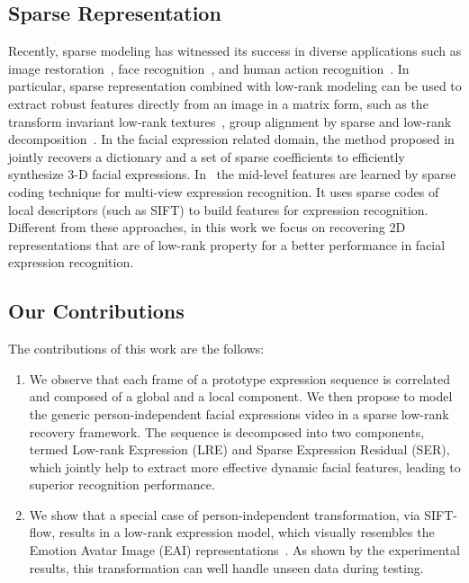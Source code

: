 \documentclass[journal]{IEEEtran}
\begin{document}
\subsection{Sparse Representation}

Recently, sparse modeling has witnessed its success in diverse applications such as image restoration~\cite{Yang_CVPR08}, face recognition~\cite{Wright_PAMI09}, and human action recognition~\cite{Qiu_ICCV11}. In particular, sparse representation combined with low-rank modeling can be used to extract robust features directly from an image in a matrix form, such as the transform invariant low-rank textures~\cite{Zhang_IJCV12}, group alignment by sparse and low-rank decomposition~\cite{Peng_PAMI12}. In the facial expression related domain, the method proposed in~\cite{Lin12} jointly recovers a dictionary and a set of sparse coefficients to efficiently synthesize 3-D facial expressions. In~\cite{Tariq12} the mid-level features are learned by sparse coding technique for multi-view expression recognition. It uses sparse codes of local descriptors (such as SIFT) to build features for expression recognition. Different from these approaches, in this work we focus on recovering 2D representations that are of low-rank property for a better performance in facial expression recognition. 

\subsection{Our Contributions}
The contributions of this work are the follows:
\begin{enumerate}
\item We observe that each frame of a prototype expression sequence is correlated and composed of a global and a local component. We then propose to model the generic person-independent facial expressions video in a sparse low-rank recovery framework. The sequence is decomposed into two components, termed Low-rank Expression (LRE) and Sparse Expression Residual (SER), which jointly help to extract more effective dynamic facial features, leading to superior recognition performance. 
\item We show that a special case of person-independent transformation, via SIFT-flow, results in a low-rank expression model, which visually resembles the Emotion Avatar Image (EAI) representations~\cite{Yang_SMCB12}. As shown by the experimental results, this transformation can well handle unseen data during testing.
\end{enumerate}
\end{document}
